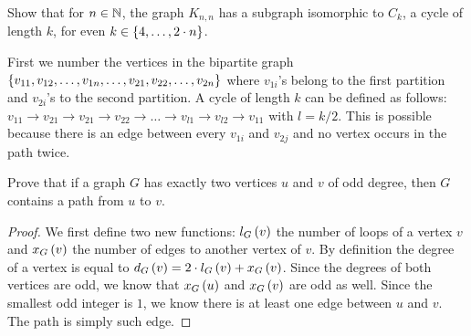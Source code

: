 \documentclass{article}
\begin{document}
\begin{exercise}
Show that for $n\in\mathbb{N}$, the graph $K_{n,n}$ has a subgraph isomorphic to $C_k$, a cycle of length $k$, for even $k\in\left\{ 4,\ldots,2\cdot n \right\}$.
\begin{answer}
First we number the vertices in the bipartite graph $\left\{ v_{11},v_{12},\ldots,v_{1n},\ldots,v_{21},v_{22},\ldots,v_{2n} \right\}$ where $v_{1i}$'s belong to the first partition and $v_{2i}$'s to the second partition. A cycle of length $k$ can be defined as follows: $v_{11}\rightarrow v_{21}\rightarrow v_{21}\rightarrow v_{22}\rightarrow\ldots\rightarrow v_{l1}\rightarrow v_{l2}\rightarrow v_{11}$ with $l=k/2$. This is possible because there is an edge between every $v_{1i}$ and $v_{2j}$ and no vertex occurs in the path twice.
\end{answer}
\end{exercise}

\begin{exercise}
Prove that if a graph $G$ has exactly two vertices $u$ and $v$ of odd degree, then $G$ contains a path from $u$ to $v$.
\begin{answer}
\begin{proof}
We first define two new functions: $l_G\left( v \right)$ the number of loops of a vertex $v$ and $x_G\left( v \right)$ the number of edges to another vertex of $v$. By definition the degree of a vertex is equal to $d_G\left( v \right)=2\cdot l_G\left( v \right)+x_G\left( v \right)$. Since the degrees of both vertices are odd, we know that $x_G\left( u \right)$ and $x_G\left( v \right)$ are odd as well. Since the smallest odd integer is $1$, we know there is at least one edge between $u$ and $v$. The path is simply such edge.
\end{proof}
\end{answer}
\end{exercise}
\end{document}
